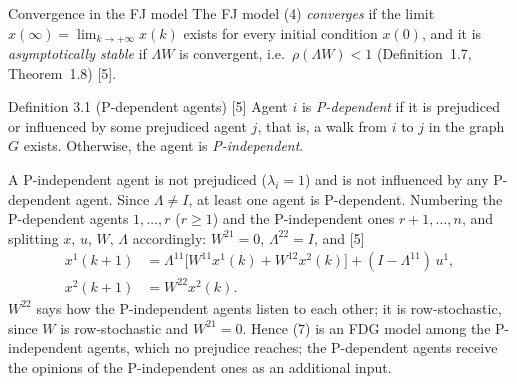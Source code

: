 \documentclass[10pt, aspectratio=169]{beamer}
\newcommand{\detailbuttons}[1]{%
  \begin{tikzpicture}[remember picture, overlay]
    \node[anchor=south east, inner sep=0pt] at ([xshift=-3mm, yshift=6mm]current page.south east) {#1};
  \end{tikzpicture}}
\newcommand{\go}[2]{\hyperlink{#1}{\beamergotobutton{#2}}}
\newcommand{\compactblocks}{\setbeamerfont{block title}{size=\small}}
\begin{document}
\begin{frame}[label=m-fj-conv]{Convergence in the FJ model}
  \compactblocks
  \small
  The FJ model (4) \emph{converges} if the limit $x(\infty) = \lim_{k \to +\infty} x(k)$
  exists for every initial condition $x(0)$, and it is \emph{asymptotically stable} if
  $\Lambda W$ is convergent, i.e.\ $\rho(\Lambda W) < 1$ (Definition~1.7,
  Theorem~1.8) [5].
  \begin{block}{Definition 3.1 (P-dependent agents) [5]}
    \footnotesize
    Agent $i$ is \emph{P-dependent} if it is prejudiced or influenced by some
    prejudiced agent $j$, that is, a walk from $i$ to $j$ in the graph $G$ exists.
    Otherwise, the agent is \emph{P-independent}.
  \end{block}
  \footnotesize
  A P-independent agent is not prejudiced ($\lambda_i = 1$) and is not influenced by any
  P-dependent agent. Since $\Lambda \neq I$, at least one agent is P-dependent. Numbering
  the P-dependent agents $1, \dots, r$ ($r \geq 1$) and the P-independent ones
  $r+1, \dots, n$, and splitting $x$, $u$, $W$, $\Lambda$ accordingly: $W^{21} = 0$,
  $\Lambda^{22} = I$, and [5]
  \begin{align*}
    x^1(k+1) &= \Lambda^{11}\bigl[W^{11} x^1(k) + W^{12} x^2(k)\bigr]
                + (I - \Lambda^{11})\, u^1, \tag{6}\\
    x^2(k+1) &= W^{22} x^2(k). \tag{7}
  \end{align*}
  $W^{22}$ says how the P-independent agents listen to each other; it is row-stochastic,
  since $W$ is row-stochastic and $W^{21} = 0$. Hence (7) is an FDG model among the
  P-independent agents, which no prejudice reaches; the P-dependent agents receive the
  opinions of the P-independent ones as an additional input.
\end{frame}
\end{document}
